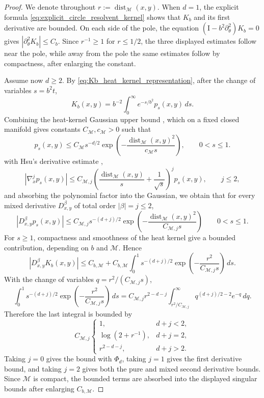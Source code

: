 \documentclass[11pt]{article}
\theoremstyle{definition}
\def\M{\mathcal M}
\def\I{\mathrm{I}}
\begin{document}
\begin{proof} We denote throughout $r:=\operatorname{dist}_{\M}(x,y)$.
When  \(d=1\), the explicit formula \eqref{eq:explicit_circle_resolvent_kernel}
shows that \(K_b\) and its first derivative are bounded. On
each side of the pole, the equation \((\I-b^2\partial_\theta^2)K_b=0\) gives
\(|\partial_\theta^2K_b|\le C_b\). Since \(r^{-1}\ge1\)  for \(r\le1/2\), the
three displayed estimates follow  near the pole, while away from the pole the
same estimates follow by compactness, after enlarging the constant.

Assume now \(d\ge2\). By \eqref{eq:Kb_heat_kernel_representation}, after the change of variables \(s=b^2t\),
\[
K_b(x,y)=b^{-2}\int_0^\infty e^{-s/b^2}p_s(x,y)\,ds.
\]
Combining the heat-kernel Gaussian upper bound
\cite[Theorem~4]{cheng_li_yau_1981_upper_heat}, which on a fixed closed
manifold gives constants \(C_{\M},c_{\M}>0\) such that
\[
p_s(x,y)
\le
C_{\M}s^{-d/2}
\exp\left(-\frac{\operatorname{dist}_{\M}(x,y)^2}{c_{\M}s}\right),
\qquad 0<s\le1 .
\]
with Hsu's derivative estimate
\cite[Corollary~1.2]{hsu1999estimates},
\[
|\nabla_x^j p_s(x,y)|
\le
C_{\M,j}
\left(\frac{\operatorname{dist}_{\M}(x,y)}{s}+\frac{1}{\sqrt{s}}\right)^j
p_s(x,y),
\qquad j\le2,
\]
 and absorbing the polynomial factor into the Gaussian, we obtain that for every mixed derivative $D^\beta_{x,y}$ of total order $|\beta|=j\leq 2$,
\[
|D^\beta_{x,y}p_s(x,y)|
\le
C_{\M,j}s^{-(d+j)/2}
\exp\left(-\frac{\operatorname{dist}_{\M}(x,y)^2}{C_{\M,j}s}\right)
\qquad 0<s\le1 .
\]
 For \(s\ge1\), compactness and smoothness of the heat kernel give a bounded
contribution, depending on \(b\) and \(\M\). Hence
\[
|D^\beta_{x,y}K_b(x,y)|
\le
C_{b,\M}
+C_{b,\M}\int_0^1
s^{-(d+j)/2}\exp\left(-\frac{r^2}{C_{\M,j}s}\right)\,ds .
\]
With the change of variables \(q=r^2/(C_{\M,j}s)\),
\[
\int_0^1
s^{-(d+j)/2}\exp\left(-\frac{r^2}{C_{\M,j}s}\right)\,ds
=
C_{\M,j}r^{2-d-j}
\int_{r^2/C_{\M,j}}^\infty q^{(d+j)/2-2}e^{-q}\,dq .
\]
 Therefore the last integral is bounded by
\[
C_{\M,j}
\begin{cases}
1, & d+j<2,\\
\log(2+r^{-1}), & d+j=2,\\
r^{2-d-j}, & d+j>2.
\end{cases}
\]
Taking \(j=0\) gives the bound with \(\Phi_d\), taking \(j=1\) gives the first
derivative bound, and taking \(j=2\) gives both the pure and mixed second
derivative bounds. Since \(\M\) is compact, the bounded terms are
absorbed into the displayed singular bounds after enlarging \(C_{b,\M}\).
\end{proof}
\end{document}
